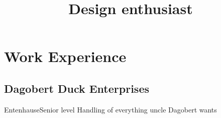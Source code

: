 \documentclass[11pt,a4paper]{moderncv}
\title{Design enthusiast}
\begin{document}
\maketitle

\section{Work Experience}

\subsection{Dagobert Duck Enterprises}


{Entenhause}{Senior level}
{Handling of everything uncle Dagobert wants}
\end{document}
